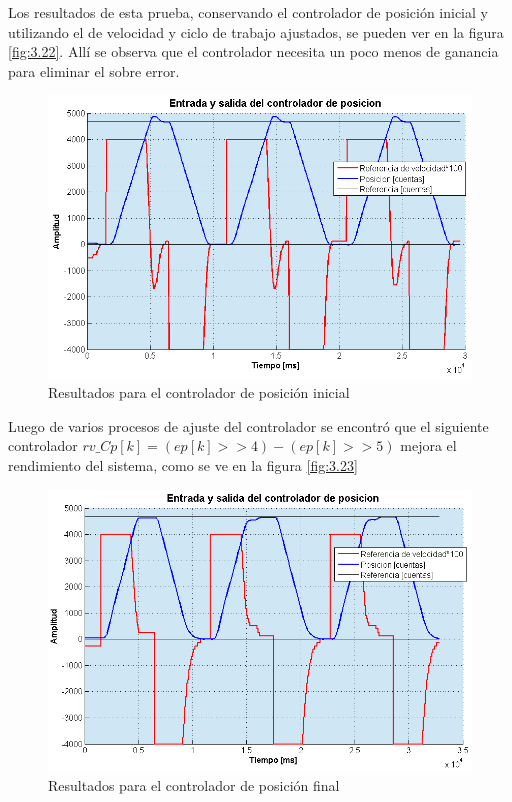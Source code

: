 Los resultados de esta prueba, conservando el controlador de posición inicial y utilizando el de velocidad y ciclo de trabajo ajustados, se pueden ver en la figura \ref{fig:3.22}. Allí se observa que el controlador necesita un poco menos de ganancia para eliminar el sobre error.

\begin{figure}[!ht]
	\centering
	\includegraphics[width=15cm,scale=1]{resources/3_22-esquemaControl3.png}
	\caption{Resultados para el controlador de posición inicial}
	\label{fig:\thefigure}
\end{figure}

Luego de varios procesos de ajuste del controlador se encontró que el siguiente controlador \(rv\_Cp[k] = (ep[k] >> 4) - (ep[k] >> 5)\) mejora el rendimiento del sistema, como se ve en la figura \ref{fig:3.23}


\begin{figure}[!ht]
	\centering
	\includegraphics[width=15cm,scale=1]{resources/3_23-esquemaControl4.png}
	\caption{Resultados para el controlador de posición final}
	\label{fig:\thefigure}
\end{figure}

